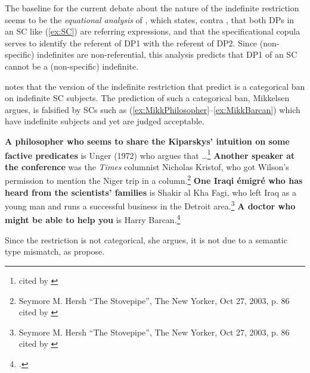 \documentclass[
	letterpaper,
]{article}
\begin{document}
The baseline for the current debate about the nature of the indefinite restriction seems to be the \textit{equational analysis} of \textcite{heycockkroch1999pseudocleft}, which states, contra \textcite{moro1997raising}, that both DPs in an SC like (\ref{ex:SC}) are referring expressions, and that the specificational copula serves to identify the referent of DP1 with the referent of DP2.
Since (non-specific) indefinites are non-referential, this analysis predicts that DP1 of an SC cannot be a (non-specific) indefinite.

\textcite{mikkelsen2005copular} notes that the version of the indefinite restriction that \textcite{heycockkroch1999pseudocleft} predict is a categorical ban on indefinite SC subjects.
The prediction of such a categorical ban, Mikkelsen argues, is falsified by SCs such as (\ref{ex:MikkPhilosopher}--\ref{ex:MikkBarcan}) which have indefinite subjects and yet are judged acceptable. 
\begin{exe}
	\ex\label{ex:MikkPhilosopher} \textbf{A philosopher who seems to share the Kiparskys' intuition on some factive predicates} is Unger (1972) who argues that \dots\footnote{\textcite[][p. 195 fn8]{delacruz1976factives} cited by \textcite[117]{mikkelsen2005copular}}
	\ex\label{ex:MikkSpeaker} \textbf{Another speaker at the conference} was the \textit{Times} columnist Nicholas Kristof, who got Wilson's permission to mention the Niger trip in a column.\footnote{Seymore M. Hersh ``The Stovepipe'', The New Yorker, Oct 27, 2003, p. 86 cited by \textcite[118]{mikkelsen2005copular}}
	\ex\label{ex:MikkEmigre} \textbf{One Iraqi \'emigr\'e who has heard from the scientists' families} is Shakir al Kha Fagi, who left Iraq as a young man and runs a successful business in the Detroit area.\footnote{Seymore M. Hersh ``The Stovepipe'', The New Yorker, Oct 27, 2003, p. 86 cited by \textcite[118]{mikkelsen2005copular}}
	\ex\label{ex:MikkBarcan} \textbf{A doctor who might be able to help you} is Harry Barcan.\footcite[118]{mikkelsen2005copular}
\end{exe}
Since the restriction is not categorical, she argues, it is not due to a semantic type mismatch, as \textcite{heycockkroch1999pseudocleft} propose.
\end{document}
